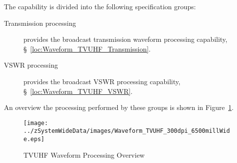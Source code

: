 The \ThisSys \ThisSegment \TVUHF capability is divided into the following specification groups:
\begin{description}
	\item[Transmission processing] provides the \TVUHF broadcast transmission waveform processing capability, \S~\ref{loc:Waveform_TVUHF_Transmission}.
	\item[VSWR processing]  provides the \TVUHF broadcast VSWR processing capability, \S~\ref{loc:Waveform_TVUHF_VSWR}.
\end{description}
An overview the processing performed by these groups is shown in Figure~\ref{fig:TVUHF_Waveform_Processing}.
\begin{figure}[htbp]
	\centering
		\texttt{[image: ../zSystemWideData/images/Waveform\_TVUHF\_300dpi\_6500millWide.eps]}
	\caption[TVUHF Waveform Processing Overview]{TVUHF Waveform Processing Overview}
	\label{fig:TVUHF_Waveform_Processing}
\end{figure}

%
%
%


